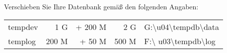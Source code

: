 \item Verschieben Sie Ihre Datenbank  gemäß den
folgenden Angaben:
\begin{center}
  \begin{small}
    \tablehead{
    }
    \tabletail {
    }
    \tablelasttail {
    }
    \begin{supertabular}{lrrrl}
      tempdev &   1 G & + 200 M & 2 G &
      G:\textbackslash u04\textbackslash tempdb\textbackslash data \\
      templog & 200 M & + 50 M & 500 M & F:\textbackslash
      u03\textbackslash tempdb\textbackslash log \\
    \end{supertabular}
  \end{small}
\end{center}
